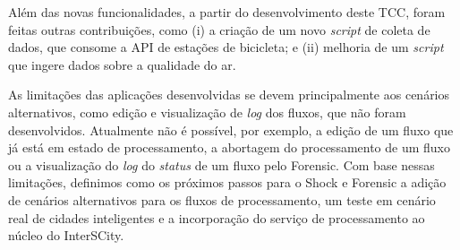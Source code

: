 Além das novas funcionalidades, a partir do desenvolvimento deste TCC, foram
feitas outras contribuições, como (i) a criação de um novo \textit{script} de
coleta de dados, que consome a API de estações de bicicleta; e (ii) melhoria 
de um \textit{script} que ingere dados sobre a qualidade do ar.

As limitações das aplicações desenvolvidas se devem principalmente aos cenários
alternativos, como edição e visualização de \textit{log} dos fluxos,
que não foram desenvolvidos. Atualmente não é possível, por exemplo, a edição de
um fluxo que já está em estado de processamento, a abortagem do
processamento de um fluxo ou a visualização do \textit{log} do
\textit{status} de um fluxo pelo Forensic. Com base nessas limitações,
definimos como os próximos passos para o Shock e Forensic a adição de cenários
alternativos para os fluxos de processamento, um teste em cenário real de cidades
inteligentes e a incorporação do serviço de processamento ao núcleo do
InterSCity.
